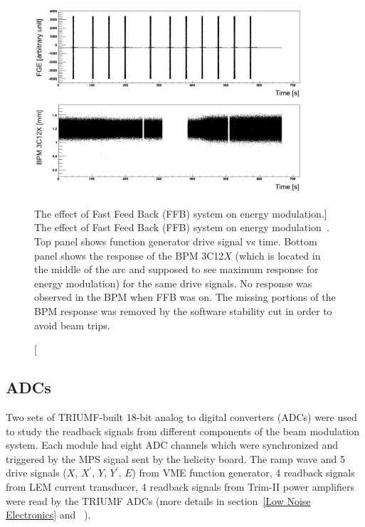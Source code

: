 \begin{singlespace}
\begin{figure}[!h]
	\begin{center}
	\includegraphics[width=10.0cm]{figures/FFBEnergy}
	\end{center}
	\caption
	[The effect of Fast Feed Back (FFB) system on energy modulation.]
	{The effect of Fast Feed Back (FFB) system on energy modulation~\cite{hclog:armd_249809}. Top panel shows function generator drive signal vs time. Bottom panel shows the response of the BPM 3C12$X$ (which is located in the middle of the arc and supposed to see maximum response for energy modulation) for the same drive signals. No response was observed in the BPM when FFB was on. The missing portions of the BPM response was removed by the software stability cut in order to avoid beam trips.}
	\label{fig:FFBEnergy}
\end{figure}
\end{singlespace}

\subsection{ADCs}
\label{ADCs}
Two sets of TRIUMF-built 18-bit analog to digital converters (ADCs) were used to study the readback signals from different components of the beam modulation system. 
Each module had eight ADC channels which were synchronized and triggered by the MPS signal sent by the helicity board.
The ramp wave and 5 drive signals ($X$, $X^{\prime}$, $Y$, $Y^{\prime}$, $E$) from VME function generator, 4 readback signals from LEM current transducer, 4 readback signals from Trim-II power amplifiers were read by the TRIUMF ADCs (more details in section~\ref{Low Noise Electronics} and~\cite{website:TRIUMF, manual_TRIUMF_ADC} ). 

